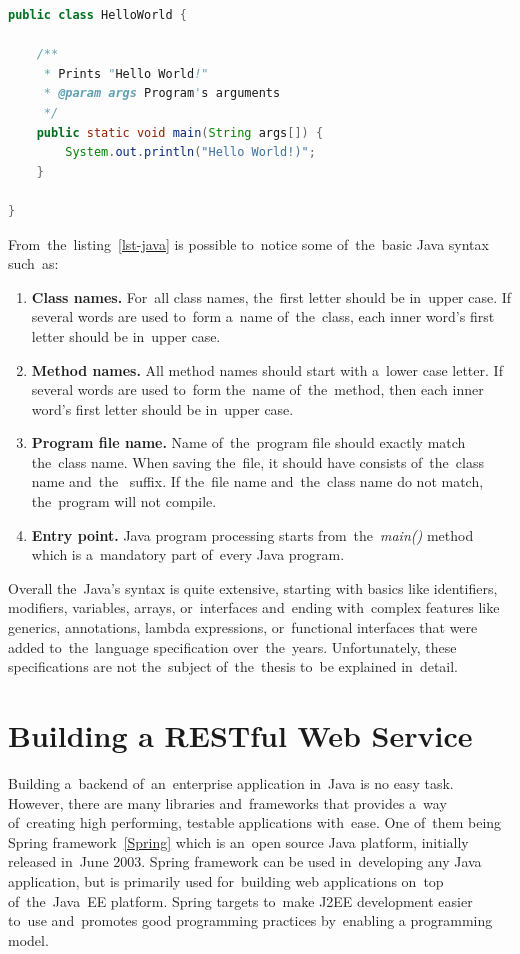 \vspace{1mm}
\begin{lstlisting}[caption=A~simple Java code that will print the~words
\uv{Hello World!}., style=dp-default, language=Java, label=lst-java]
public class HelloWorld {

	/**
	 * Prints "Hello World!"
	 * @param args Program's arguments
	 */
	public static void main(String args[]) {
		System.out.println("Hello World!)"; 
	}

}
\end{lstlisting}

From~the~listing~\ref{lst-java} is possible to~notice some of~the~basic Java
syntax such~as:

\begin{enumerate}
  \item \textbf{Class names.} For~all class names, the~first letter should be
  in~upper case. If several words are used to~form a~name of~the~class, each
  inner word's first letter should be in~upper case.
  \item \textbf{Method names.} All method names should start with a~lower case
  letter. If several words are used to~form the~name of~the~method, then each
  inner word's first letter should be in~upper case.
  \item \textbf{Program file name.} Name of~the~program file should exactly
  match the~class name. When saving the~file, it should have consists
  of~the~class name and~the~ suffix. If the~file name and~the~class
  name do not match, the~program will not compile.
  \item \textbf{Entry point.} Java program processing starts
  from~the~\textit{main()} method which is a~mandatory part of~every Java
  program.
\end{enumerate}

Overall the~Java's syntax is quite extensive, starting with basics like
identifiers, modifiers, variables, arrays, or~interfaces and~ending
with~complex features like generics, annotations, lambda expressions,
or~functional interfaces that were added to~the~language specification
over~the~years. Unfortunately, these specifications are not the~subject
of~the~thesis to~be explained in~detail.

\section{Building a RESTful Web Service}
Building a~backend of~an~enterprise application in~Java is no easy task.
However, there are many libraries and~frameworks that provides a~way of~creating
high performing, testable applications with~ease. One of~them being Spring
framework~\ref{Spring} which is an~open source Java platform, initially released
in~June 2003. Spring framework can be used in~developing any Java application,
but is primarily used for~building web applications on~top of~the~Java~EE
platform. Spring targets to~make J2EE development easier to~use and~promotes
good programming practices by~enabling a 
programming model.

